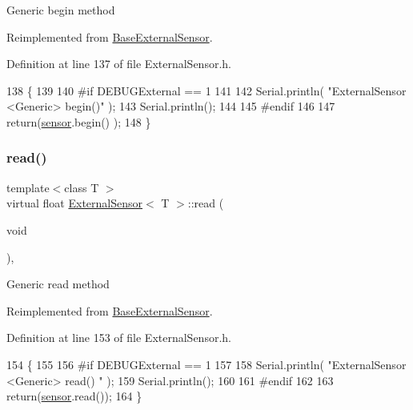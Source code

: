 Generic begin method 

Reimplemented from \hyperlink{class_base_external_sensor_a87d132803d4f4fdd4e66332809f0c9a0}{Base\+External\+Sensor}.



Definition at line 137 of file External\+Sensor.\+h.


\begin{DoxyCode}
138     \{
139     
140 \textcolor{preprocessor}{    #if DEBUGExternal == 1 }
141 
142         Serial.println( \textcolor{stringliteral}{"ExternalSensor <Generic> begin()"} );
143         Serial.println();
144     
145 \textcolor{preprocessor}{    #endif}
146 
147         \textcolor{keywordflow}{return}(\hyperlink{class_external_sensor_a6e1f518119abe08c14b498ce24a7e1b3}{sensor}.begin() );  
148     \}
\end{DoxyCode}
\mbox{\label{class_external_sensor_a5fb3afc7d244fb86dac68ab5481bc407}} 
\subsubsection{\texorpdfstring{read()}{read()}}
{\footnotesize\ttfamily template$<$class T $>$ \\
virtual float \hyperlink{class_external_sensor}{External\+Sensor}$<$ T $>$\+::read (\begin{DoxyParamCaption}\item[{void}]{ }\end{DoxyParamCaption})\hspace{0.3cm}{\ttfamily [inline]}, {\ttfamily [virtual]}}

Generic read method 

Reimplemented from \hyperlink{class_base_external_sensor_a1564f16deacf57b51b9948ac29db4291}{Base\+External\+Sensor}.



Definition at line 153 of file External\+Sensor.\+h.


\begin{DoxyCode}
154     \{
155     
156 \textcolor{preprocessor}{    #if DEBUGExternal == 1 }
157 
158         Serial.println( \textcolor{stringliteral}{"ExternalSensor <Generic> read() "} );
159         Serial.println();
160         
161 \textcolor{preprocessor}{    #endif}
162 
163         \textcolor{keywordflow}{return}(\hyperlink{class_external_sensor_a6e1f518119abe08c14b498ce24a7e1b3}{sensor}.read());
164     \}
\end{DoxyCode}


